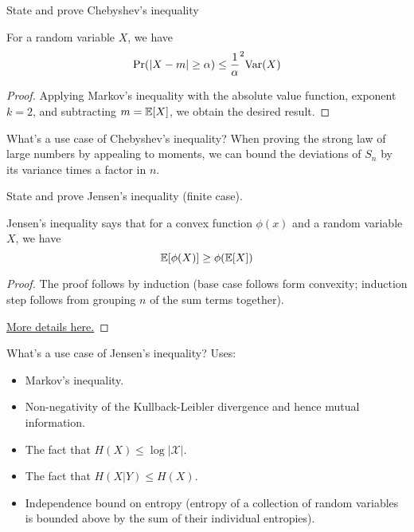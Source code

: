 \documentclass[avery5388,grid,frame]{flashcards}
\begin{document}
\begin{flashcard}
    {State and prove Chebyshev's inequality}
    \begin{theorem}
        For a random variable $X$, we have
        $$\Pr(|X - m| \geq \alpha) \leq \frac 1 \alpha^2 \text{Var}(X)$$
    \end{theorem}

    \begin{proof}
        Applying Markov's inequality with the absolute value function, exponent $k=2$, and subtracting $m = \mathbb{E}[X]$, we obtain the desired result.
    \end{proof}
\end{flashcard}


\begin{flashcard}
    {What's a use case of Chebyshev's inequality?}
    When proving the strong law of large numbers by appealing to moments, we can bound the deviations of $S_n$ by its variance times a factor in $n$.
\end{flashcard}


\begin{flashcard}
    {State and prove Jensen's inequality (finite case).}
    \begin{theorem}
        Jensen's inequality says that for a convex function $\phi(x)$ and a random variable $X$, we have
        $$\mathbb{E}[\phi(X)] \geq \phi(\mathbb{E}[X])$$
    \end{theorem}

    \begin{proof}
        The proof follows by induction (base case follows form convexity; induction step follows from grouping $n$ of the sum terms together).

        \href{https://en.wikipedia.org/wiki/Jensen%27s_inequality#Proofs}{More details here.}
    \end{proof}
\end{flashcard}


\begin{flashcard}
    {What's a use case of Jensen's inequality?}
    Uses:
    \begin{itemize}
        \item Markov's inequality.
        \item Non-negativity of the Kullback-Leibler divergence and hence mutual information.
        \item The fact that $H(X) \leq \log | \mathcal X |$.
        \item The fact that $H(X | Y) \leq H(X)$.
        \item Independence bound on entropy (entropy of a collection of random variables is bounded above by the sum of their individual entropies).
    \end{itemize}
\end{flashcard}
\end{document}
